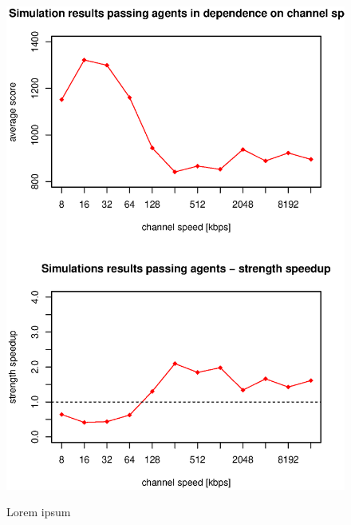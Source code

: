 \begin{figure}
\begin{center}
\includegraphics{img/simulation-passing-channel-speed.eps}
\end{center}
\caption{\footnotesize Lorem ipsum}{\footnotesize }
\label{fig_simulation_passing_channel_speed}
\end{figure}

